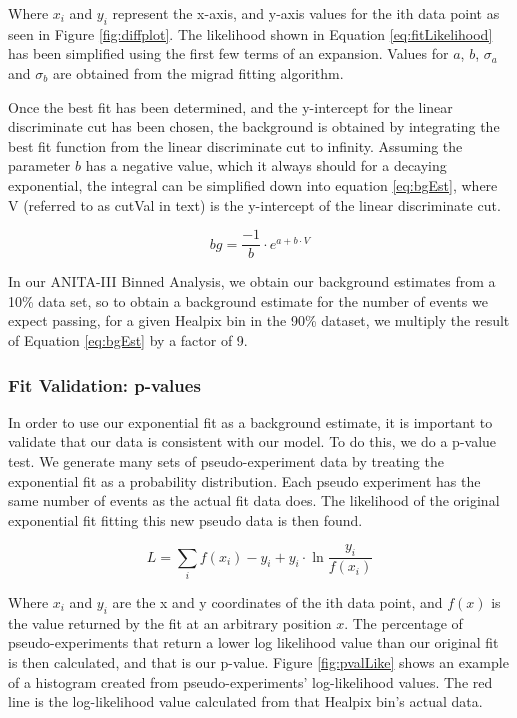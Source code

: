Where $x_i$ and $y_i$ represent the x-axis, and y-axis values for the ith data point as seen in Figure \ref{fig:diffplot}.  The likelihood shown in Equation \ref{eq:fitLikelihood} has been simplified using the first few terms of an expansion.  Values for $a$, $b$, $\sigma _a$ and $\sigma _b$ are obtained from the migrad fitting algorithm.  

Once the best fit has been determined, and the y-intercept for the linear discriminate cut has been chosen, the background is obtained by integrating the best fit function from the linear discriminate cut to infinity.  Assuming the parameter $b$ has a negative value, which it always should for a decaying exponential, the integral can be simplified down into equation \ref{eq:bgEst}, where V (referred to as cutVal in text) is the y-intercept of the linear discriminate cut.

\begin{equation} \label{eq:bgEst}
bg = \frac{-1}{b} \cdot e^{a+b \cdot V}
\end{equation}

In our ANITA-III Binned Analysis, we obtain our background estimates from a 10\% data set, so to obtain a background estimate for the number of events we expect passing, for a given Healpix bin in the 90\% dataset, we multiply the result of Equation \ref{eq:bgEst} by a factor of 9. 

\subsubsection{Fit Validation: p-values \label{subsubsec:pval}}

In order to use our exponential fit as a background estimate, it is important to validate that our data is consistent with our model.  To do this, we do a p-value test.  We generate many sets of pseudo-experiment data by treating the exponential fit as a probability distribution.  Each pseudo experiment has the same number of events as the actual fit data does.  The likelihood of the original exponential fit fitting this new pseudo data is then found.  

\begin{equation}
L = \sum_i f(x_i) - y_i + y_i \cdot \ln \frac{y_i}{f(x_i)}
\end{equation}

Where $x_i$ and $y_i$ are the x and y coordinates of the ith data point, and $f(x)$ is the value returned by the fit at an arbitrary position $x$.
The percentage of pseudo-experiments that return a lower log likelihood value than our original fit is then calculated, and that is our p-value.  Figure \ref{fig:pvalLike} shows an example of a histogram created from pseudo-experiments' log-likelihood values.  The red line is the log-likelihood value calculated from that Healpix bin's actual data.  

